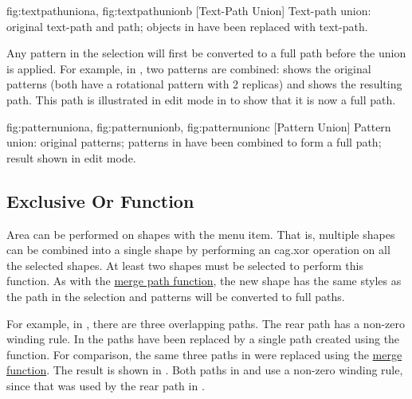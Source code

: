 {
  {fig:textpathuniona}{}{},
  {fig:textpathunionb}{}{}
}
[Text-Path Union]
{Text-path union:  original text-path
and path;  objects in
 have been replaced with text-path.}

Any \gls{pattern} in the selection will first be converted to a full
\gls{path} before the union is applied. For example, in
, two patterns are combined:
 shows the original patterns (both have
a rotational pattern with 2 replicas) and
 shows the resulting path. This path is
illustrated in edit mode in  to show
that it is now a full path.

{
  {fig:patternuniona}{}{},
  {fig:patternunionb}{}{},
  {fig:patternunionc}{}{}
}
[Pattern Union]
{Pattern union:  original patterns;
 patterns in
 have been combined to form a full
path;  result shown in edit mode.}


\subsection{Exclusive Or Function}\label{sec:xorpath}


Area  can be performed on \glspl{shape} with
the  menu item. That is, multiple \glspl{shape}
can be combined into a single \gls*{shape} by performing an
\gls{cag.xor} operation on all the selected \glspl*{shape}.  At
least two \glspl*{shape} must be selected to perform this function.
As with the \hyperref[sec:mergepaths]{merge path function}, the new
\gls*{shape} has the same styles as the 
path in the selection and \glspl{pattern} will be converted to full
\glspl{path}.

For example, in , there are three
overlapping paths.  The rear path has a non-zero winding rule. In
 the paths have been replaced by a
single path created using the  function. For comparison,
the same three paths in  were replaced
using the \hyperref[sec:mergepaths]{merge function}. The result is
shown in . Both paths in
 and  use
a non-zero winding rule, since that was used by the rear path in
.

